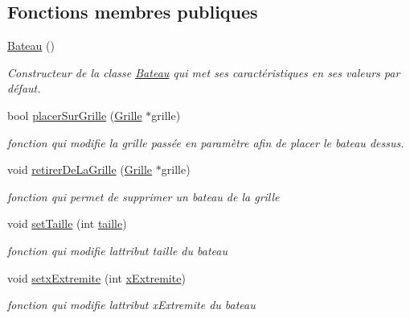 \subsection*{Fonctions membres publiques}
\begin{DoxyCompactItemize}
\item 
\hyperlink{class_bateau_af46de2e08abe6b61e218b6cbdc595bfb}{Bateau} ()\hypertarget{class_bateau_af46de2e08abe6b61e218b6cbdc595bfb}{}\label{class_bateau_af46de2e08abe6b61e218b6cbdc595bfb}

\begin{DoxyCompactList}\small\item\em Constructeur de la classe \hyperlink{class_bateau}{Bateau} qui met ses caractéristiques en ses valeurs par défaut. \end{DoxyCompactList}\item 
bool \hyperlink{class_bateau_a48296a74b25dff2eccf009b2987014e8}{placer\+Sur\+Grille} (\hyperlink{class_grille}{Grille} $\ast$grille)
\begin{DoxyCompactList}\small\item\em fonction qui modifie la grille passée en paramètre afin de placer le bateau dessus. \end{DoxyCompactList}\item 
void \hyperlink{class_bateau_a7aebd8e59d3c942967723f8e02527ac0}{retirer\+De\+La\+Grille} (\hyperlink{class_grille}{Grille} $\ast$grille)
\begin{DoxyCompactList}\small\item\em fonction qui permet de supprimer un bateau de la grille \end{DoxyCompactList}\item 
void \hyperlink{class_bateau_ac06303b2d1c9b2c9d6b29e6f65eaff26}{set\+Taille} (int \hyperlink{class_bateau_a1dd818ea44eed67f756400eaac344a95}{taille})
\begin{DoxyCompactList}\small\item\em fonction qui modifie l\textquotesingle{}attribut taille du bateau \end{DoxyCompactList}\item 
void \hyperlink{class_bateau_aecf45729913eb0c51a82475b996273ce}{setx\+Extremite} (int \hyperlink{class_bateau_ab63ce4226907ed0961b47eded901658e}{x\+Extremite})
\begin{DoxyCompactList}\small\item\em fonction qui modifie l\textquotesingle{}attribut x\+Extremite du bateau \end{DoxyCompactList}\item 

\end{DoxyCompactItemize}

